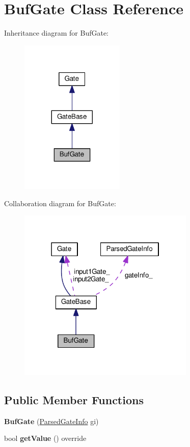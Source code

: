 \hypertarget{classBufGate}{}\section{Buf\+Gate Class Reference}
\label{classBufGate}


Inheritance diagram for Buf\+Gate\+:
\nopagebreak
\begin{figure}[H]
\begin{center}
\leavevmode
\includegraphics[width=140pt]{classBufGate__inherit__graph}
\end{center}
\end{figure}


Collaboration diagram for Buf\+Gate\+:
\nopagebreak
\begin{figure}[H]
\begin{center}
\leavevmode
\includegraphics[width=238pt]{classBufGate__coll__graph}
\end{center}
\end{figure}
\subsection*{Public Member Functions}
\begin{DoxyCompactItemize}
\item 
{\bfseries Buf\+Gate} (\hyperlink{structParsedGateInfo}{Parsed\+Gate\+Info} gi)\hypertarget{classBufGate_a8a93571f5ce7a01add4529b5c42ee557}{}\label{classBufGate_a8a93571f5ce7a01add4529b5c42ee557}

\item 
bool {\bfseries get\+Value} () override\hypertarget{classBufGate_abb0f63b8f3a24b0d61cc142b5e8427b4}{}\label{classBufGate_abb0f63b8f3a24b0d61cc142b5e8427b4}

\end{DoxyCompactItemize}
